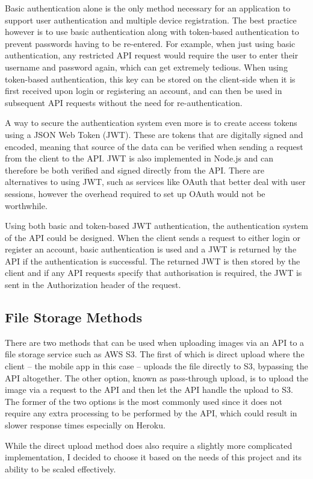Basic authentication alone is the only method necessary for an application to support user authentication and multiple device registration. The best practice however is to use basic authentication along with token-based authentication to prevent passwords having to be re-entered. For example, when just using basic authentication, any restricted API request would require the user to enter their username and password again, which can get extremely tedious. When using token-based authentication, this key can be stored on the client-side when it is first received upon login or registering an account, and can then be used in subsequent API requests without the need for re-authentication.

A way to secure the authentication system even more is to create access tokens using a JSON Web Token (JWT). These are tokens that are digitally signed and encoded, meaning that source of the data can be verified when sending a request from the client to the API. JWT is also implemented in Node.js and can therefore be both verified and signed directly from the API. There are alternatives to using JWT, such as services like OAuth that better deal with user sessions, however the overhead required to set up OAuth would not be worthwhile.

Using both basic and token-based JWT authentication, the authentication system of the API could be designed. When the client sends a request to either login or register an account, basic authentication is used and a JWT is returned by the API if the authentication is successful. The returned JWT is then stored by the client and if any API requests specify that authorisation is required, the JWT is sent in the Authorization header of the request.
 
\subsection{File Storage Methods} \label{subsection:file-storage-methods}

There are two methods that can be used when uploading images via an API to a file storage service such as AWS S3. The first of which is direct upload where the client -- the mobile app in this case -- uploads the file directly to S3, bypassing the API altogether. The other option, known as pass-through upload, is to upload the image via a request to the API and then let the API handle the upload to S3. The former of the two options is the most commonly used since it does not require any extra processing to be performed by the API, which could result in slower response times especially on Heroku.

While the direct upload method does also require a slightly more complicated implementation, I decided to choose it based on the needs of this project and its ability to be scaled effectively.
